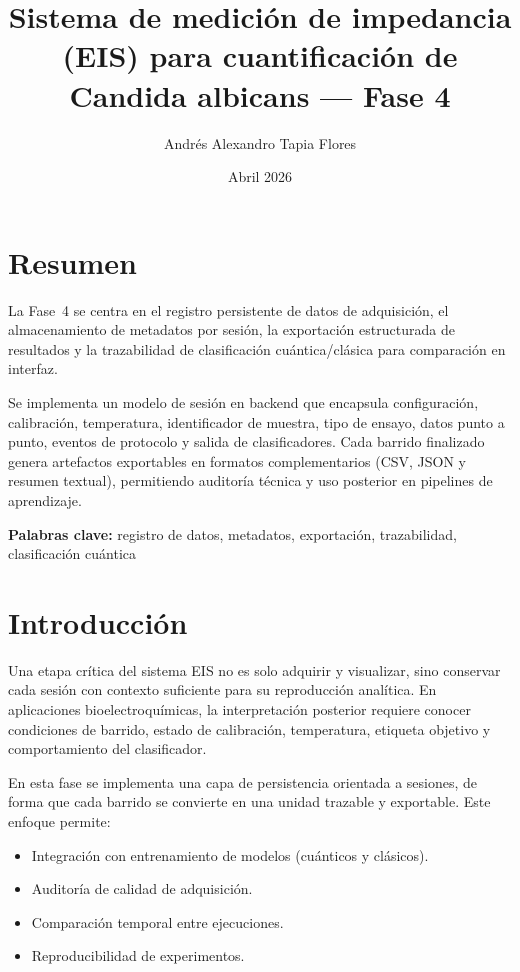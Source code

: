 \documentclass[11pt,a4paper,spanish]{book}
\title{Sistema de medici\'{o}n de impedancia (EIS) para cuantificaci\'{o}n de Candida albicans --- Fase 4}
\author{Andr\'{e}s Alexandro Tapia Flores}
\date{Abril 2026}
\begin{document}
\renewcommand{\listfigurename}{\'{I}ndice de figuras}
\renewcommand{\contentsname}{\'{I}ndice de contenidos}
\renewcommand{\figurename}{Figura}
\renewcommand{\tablename}{Tabla}
\setlength{\headheight}{26pt}

\maketitle
\frontmatter
\tableofcontents

\chapter{Resumen}
La Fase~4 se centra en el registro persistente de datos de adquisici\'{o}n, el almacenamiento de metadatos por sesi\'{o}n, la exportaci\'{o}n estructurada de resultados y la trazabilidad de clasificaci\'{o}n cu\'{a}ntica/cl\'{a}sica para comparaci\'{o}n en interfaz.

Se implementa un modelo de sesi\'{o}n en backend que encapsula configuraci\'{o}n, calibraci\'{o}n, temperatura, identificador de muestra, tipo de ensayo, datos punto a punto, eventos de protocolo y salida de clasificadores. Cada barrido finalizado genera artefactos exportables en formatos complementarios (CSV, JSON y resumen textual), permitiendo auditor\'{i}a t\'{e}cnica y uso posterior en pipelines de aprendizaje.

\vspace{0.5cm}
{\bf Palabras clave:} registro de datos, metadatos, exportaci\'{o}n, trazabilidad, clasificaci\'{o}n cu\'{a}ntica

\mainmatter

\chapter{Introducci\'{o}n}

Una etapa cr\'{i}tica del sistema EIS no es solo adquirir y visualizar, sino conservar cada sesi\'{o}n con contexto suficiente para su reproducci\'{o}n anal\'{i}tica. En aplicaciones bioelectroqu\'{i}micas, la interpretaci\'{o}n posterior requiere conocer condiciones de barrido, estado de calibraci\'{o}n, temperatura, etiqueta objetivo y comportamiento del clasificador.

En esta fase se implementa una capa de persistencia orientada a sesiones, de forma que cada barrido se convierte en una unidad trazable y exportable. Este enfoque permite:
\begin{itemize}
	\item Integraci\'{o}n con entrenamiento de modelos (cu\'{a}nticos y cl\'{a}sicos).
	\item Auditor\'{i}a de calidad de adquisici\'{o}n.
	\item Comparaci\'{o}n temporal entre ejecuciones.
	\item Reproducibilidad de experimentos.
\end{itemize}
\end{document}
